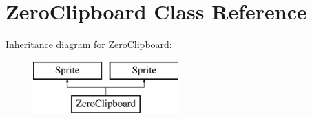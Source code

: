 \hypertarget{class_zero_clipboard}{\section{Zero\+Clipboard Class Reference}
\label{class_zero_clipboard}
}
Inheritance diagram for Zero\+Clipboard\+:\begin{figure}[H]
\begin{center}
\leavevmode
\includegraphics[height=2.000000cm]{class_zero_clipboard}
\end{center}
\end{figure}

